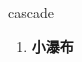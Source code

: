 
\begin{frame}
{\huge cascade}
\begin{center}
\begin{enumerate}\Large
  \item \textbf{小瀑布}
\end{enumerate}
\end{center}
\end{frame}
